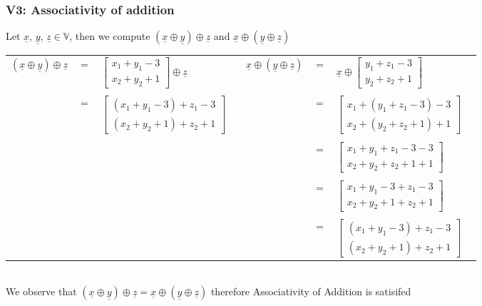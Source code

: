 \documentclass{article}
\begin{document}
\subsubsection*{V3: Associativity of addition}
Let $\underline{x}$, $\underline{y}$, $\underline{z}\in \mathbb{V}$, then we compute $(\underline{x}\oplus\underline{y})\oplus\underline{z}$ and $\underline{x}\oplus(\underline{y}\oplus\underline{z})$
\begin{table}[htp]
\centering
\begin{tabular}{cclc|cclc}
  $(\underline{x}\oplus\underline{y})\oplus\underline{z}$ & $=$  & $\begin{bmatrix} x_1 + y_1 - 3 \\ x_2 + y_2 + 1 \end{bmatrix}\oplus\underline{z}$  &   & $\underline{x}\oplus(\underline{y}\oplus\underline{z})$  & $=$  & $\underline{x}\oplus\begin{bmatrix} y_1 + z_1 - 3 \\ y_2 + z_2 + 1 \end{bmatrix}$  &   \\
   &&&&&&&\\
   & $=$  & $\begin{bmatrix} ( x_1 + y_1 - 3)+z_{1}-3\\ ( x_2 + y_2 + 1) +z_{2}+1\end{bmatrix}$  &   &   & $=$  & $\begin{bmatrix}x_{1} +( y_1 + z_1 - 3) -3 \\x_{2}+( y_2 + z_2 + 1)+1 \end{bmatrix}$  &   \\
   &&&&&&&\\
   &   &   &   &   & $=$  & $\begin{bmatrix}x_{1} + y_1 + z_1 - 3 -3 \\x_{2}+ y_2 + z_2 + 1+1 \end{bmatrix}$  &   \\
   &&&&&&&\\
   &   &   &   &   &  $=$ &  $\begin{bmatrix}  x_1 + y_1 - 3+z_{1}-3\\ x_2 + y_2 + 1 +z_{2}+1\end{bmatrix}$  &   \\
   &&&&&&&\\
   &&&&&$=$& $\begin{bmatrix} ( x_1 + y_1 - 3)+z_{1}-3\\ ( x_2 + y_2 + 1) +z_{2}+1\end{bmatrix}$ &  
\end{tabular}
\end{table}\\
We observe that $(\underline{x}\oplus\underline{y})\oplus\underline{z}=\underline{x}\oplus(\underline{y}\oplus\underline{z})$ therefore Associativity of Addition is satisifed
\end{document}

